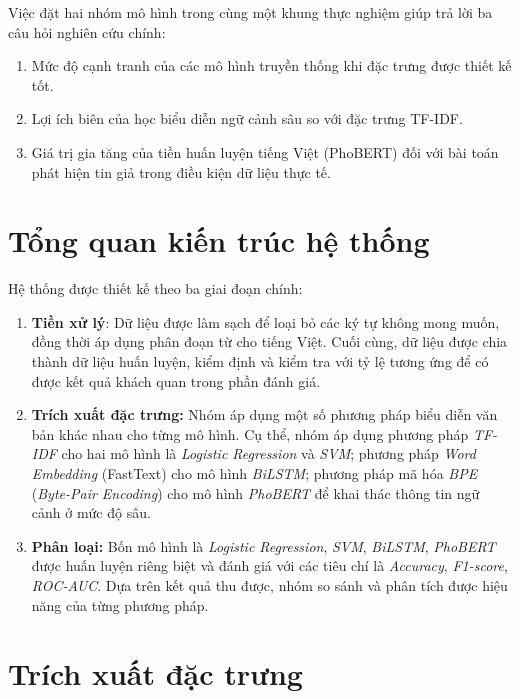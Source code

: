 \documentclass[12pt, a4paper]{report}
\begin{document}
Việc đặt hai nhóm mô hình trong cùng một khung thực nghiệm giúp trả lời
ba câu hỏi nghiên cứu chính:

\begin{enumerate}
    \item Mức độ cạnh tranh của các mô hình truyền thống khi đặc trưng
    được thiết kế tốt.
    \item Lợi ích biên của học biểu diễn ngữ cảnh sâu so với đặc trưng
    TF-IDF.
    \item Giá trị gia tăng của tiền huấn luyện tiếng Việt (PhoBERT)
    đối với bài toán phát hiện tin giả trong điều kiện dữ liệu thực tế.
\end{enumerate}
\section{Tổng quan kiến trúc hệ thống}

Hệ thống được thiết kế theo ba giai đoạn chính:

\begin{enumerate}[leftmargin=3.3em]
  \item \textbf{Tiền xử lý}: Dữ liệu được làm sạch để loại bỏ các ký tự không mong muốn, đồng thời áp dụng phân đoạn từ cho tiếng Việt. Cuối cùng, dữ liệu được chia thành dữ liệu huấn luyện, kiểm định và kiểm tra với tỷ lệ tương ứng để có được kết quả khách quan trong phần đánh giá.

  \item \textbf{Trích xuất đặc trưng:} Nhóm áp dụng một số phương pháp biểu diễn văn bản khác nhau cho từng mô hình. Cụ thể, nhóm áp dụng phương pháp \textit{TF-IDF} cho hai mô hình là \textit{Logistic Regression} và \textit{SVM}; phương pháp \textit{Word Embedding} (FastText) cho mô hình \textit{BiLSTM}; phương pháp mã hóa \textit{BPE} (\textit{Byte-Pair Encoding}) cho mô hình \textit{PhoBERT} để khai thác thông tin ngữ cảnh ở mức độ sâu.

  \item \textbf{Phân loại:} Bốn mô hình là \textit{Logistic Regression}, \textit{SVM}, \textit{BiLSTM}, \textit{PhoBERT} được huấn luyện riêng biệt và đánh giá với các tiêu chí là \textit{Accuracy}, \textit{F1-score}, \textit{ROC-AUC}. Dựa trên kết quả thu được, nhóm so sánh và phân tích được hiệu năng của từng phương pháp.
\end{enumerate}

\section{Trích xuất đặc trưng}
\end{document}
